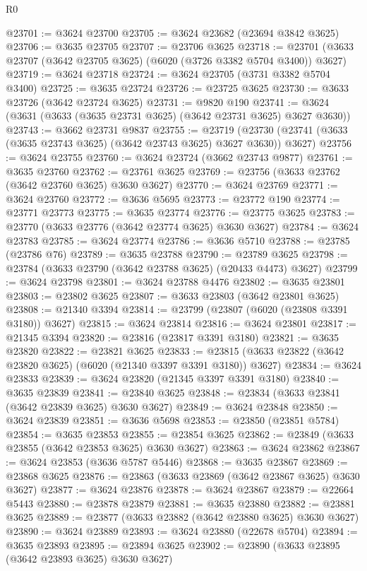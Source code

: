 \begin{lexlean}{R0}
\begin{coremodule}
@23701 := @3624 @23700
@23705 := @3624 @23682 (@23694 @3842 @3625)
@23706 := @3635 @23705
@23707 := @23706 @3625
@23718 := @23701 (@3633 @23707 (@3642 @23705 @3625) (@6020 (@3726 @3382 @5704 @3400)) @3627)
@23719 := @3624 @23718
@23724 := @3624 @23705 (@3731 @3382 @5704 @3400)
@23725 := @3635 @23724
@23726 := @23725 @3625
@23730 := @3633 @23726 (@3642 @23724 @3625)
@23731 := @9820 @190
@23741 := @3624 (@3631 (@3633 (@3635 @23731 @3625) (@3642 @23731 @3625) @3627 @3630))
@23743 := @3662 @23731 @9837
@23755 := @23719
    (@23730 (@23741 (@3633 (@3635 @23743 @3625) (@3642 @23743 @3625) @3627 @3630)) @3627)
@23756 := @3624 @23755
@23760 := @3624 @23724 (@3662 @23743 @9877)
@23761 := @3635 @23760
@23762 := @23761 @3625
@23769 := @23756 (@3633 @23762 (@3642 @23760 @3625) @3630 @3627)
@23770 := @3624 @23769
@23771 := @3624 @23760
@23772 := @3636 @5695
@23773 := @23772 @190
@23774 := @23771 @23773
@23775 := @3635 @23774
@23776 := @23775 @3625
@23783 := @23770 (@3633 @23776 (@3642 @23774 @3625) @3630 @3627)
@23784 := @3624 @23783
@23785 := @3624 @23774
@23786 := @3636 @5710
@23788 := @23785 (@23786 @76)
@23789 := @3635 @23788
@23790 := @23789 @3625
@23798 := @23784 (@3633 @23790 (@3642 @23788 @3625) (@20433 @4473) @3627)
@23799 := @3624 @23798
@23801 := @3624 @23788 @4476
@23802 := @3635 @23801
@23803 := @23802 @3625
@23807 := @3633 @23803 (@3642 @23801 @3625)
@23808 := @21340 @3394
@23814 := @23799 (@23807 (@6020 (@23808 @3391 @3180)) @3627)
@23815 := @3624 @23814
@23816 := @3624 @23801
@23817 := @21345 @3394
@23820 := @23816 (@23817 @3391 @3180)
@23821 := @3635 @23820
@23822 := @23821 @3625
@23833 := @23815 (@3633 @23822 (@3642 @23820 @3625) (@6020 (@21340 @3397 @3391 @3180)) @3627)
@23834 := @3624 @23833
@23839 := @3624 @23820 (@21345 @3397 @3391 @3180)
@23840 := @3635 @23839
@23841 := @23840 @3625
@23848 := @23834 (@3633 @23841 (@3642 @23839 @3625) @3630 @3627)
@23849 := @3624 @23848
@23850 := @3624 @23839
@23851 := @3636 @5698
@23853 := @23850 (@23851 @5784)
@23854 := @3635 @23853
@23855 := @23854 @3625
@23862 := @23849 (@3633 @23855 (@3642 @23853 @3625) @3630 @3627)
@23863 := @3624 @23862
@23867 := @3624 @23853 (@3636 @5787 @5446)
@23868 := @3635 @23867
@23869 := @23868 @3625
@23876 := @23863 (@3633 @23869 (@3642 @23867 @3625) @3630 @3627)
@23877 := @3624 @23876
@23878 := @3624 @23867
@23879 := @22664 @5443
@23880 := @23878 @23879
@23881 := @3635 @23880
@23882 := @23881 @3625
@23889 := @23877 (@3633 @23882 (@3642 @23880 @3625) @3630 @3627)
@23890 := @3624 @23889
@23893 := @3624 @23880 (@22678 @5704)
@23894 := @3635 @23893
@23895 := @23894 @3625
@23902 := @23890 (@3633 @23895 (@3642 @23893 @3625) @3630 @3627)

\end{coremodule}
\end{lexlean}
